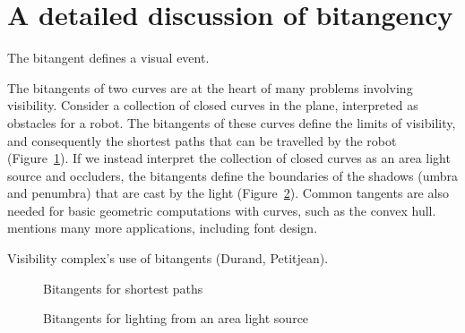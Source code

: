 \documentclass[12pt]{article}
\newif\ifTalk
\begin{document}
\listoffigures

\clearpage


\section{A detailed discussion of bitangency}
\label{sec:bitangency}

The bitangent defines a visual event.

\ifTalk
\begin{rmk}
Where do you throw the ball so that it can be caught by another curve?
A bitangent indicates where the ball should be thrown from one curve 
so that it can be caught by a second curve.
Point/curve: Where do you shoot to hit the target (as you run around a track)?
Where does the spotlight illuminate a given spot?
\end{rmk}
\fi

The bitangents of two curves are at the heart of many problems
involving visibility.
Consider a collection of closed curves in the plane, interpreted as 
obstacles for a robot.
The bitangents of these curves define the limits of visibility,
and consequently the shortest paths that can be travelled by the robot
(Figure~\ref{fig:applications}).
If we instead interpret the collection of closed curves as 
an area light source and occluders,
the bitangents define the boundaries of the shadows (umbra and 
penumbra) that are cast by the light (Figure~\ref{fig:appl2}).
Common tangents are also needed for basic geometric computations with curves,
such as the convex hull.
\cite{parida95} mentions many more applications, including font design.

Visibility complex's use of bitangents (Durand, Petitjean).

\begin{figure}
\caption{Bitangents for shortest paths}
\label{fig:applications}
\end{figure}

\begin{figure}
\caption{Bitangents for lighting from an area light source}
\label{fig:appl2}
\end{figure}
\end{document}
